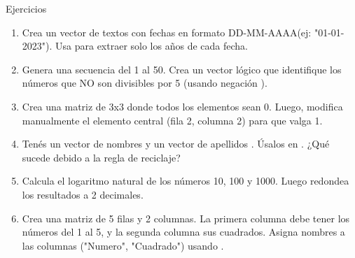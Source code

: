 \documentclass[8pt]{beamer}
\begin{document}
\begin{frame}[fragile]{Ejercicios}	
	\begin{enumerate}[start  = 18]
		\item Crea un vector de textos con fechas en formato \guillemetleft DD-MM-AAAA\guillemetright  (ej: "01-01-2023"). Usa  para extraer solo los años de cada fecha.
		\item Genera una secuencia del 1 al 50. Crea un vector lógico que identifique los números que NO son divisibles por 5 (usando negación \rscript{!}).
		\item Crea una matriz de 3x3 donde todos los elementos sean 0. Luego, modifica manualmente el elemento central (fila 2, columna 2) para que valga 1.
		\item Ten\'es un vector de nombres  y un vector de apellidos . Úsalos en . ¿Qué sucede debido a la regla de reciclaje?
		\item Calcula el logaritmo natural de los números 10, 100 y 1000. Luego redondea los resultados a 2 decimales.
		\item Crea una matriz de 5 filas y 2 columnas. La primera columna debe tener los números del 1 al 5, y la segunda columna sus cuadrados. Asigna nombres a las columnas ("Numero", "Cuadrado") usando .
	\end{enumerate}
\end{frame}
\end{document}
